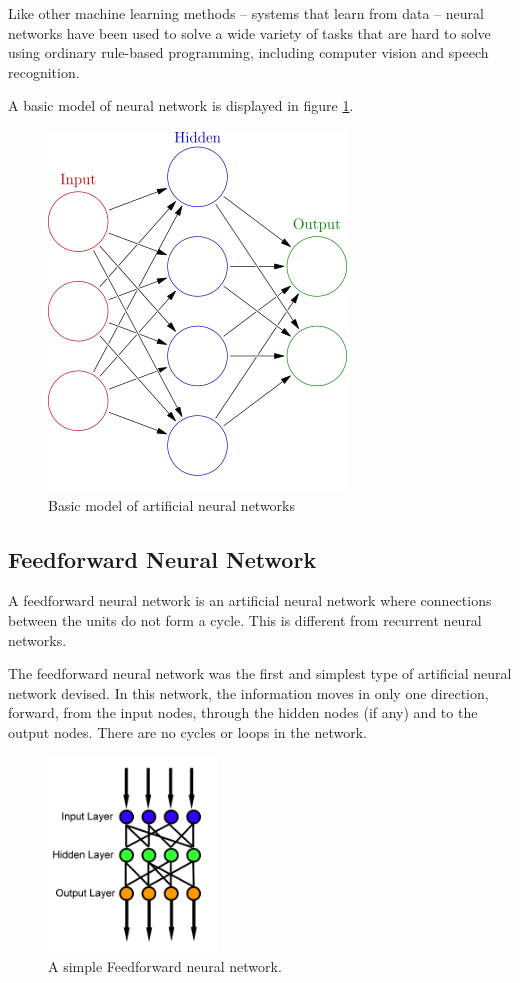 \documentclass[14pt,a4paper]{extarticle}
\begin{document}
Like other machine learning methods – systems that learn from data – neural networks have been used to solve a wide variety of tasks that are hard to solve using ordinary rule-based programming, including computer vision and speech recognition.

A basic model of neural network is displayed in figure \ref{fig:neural_net_model}.

		\begin{figure}[H]
			\includegraphics[width=.4\textwidth, center]{neural_net_example.png}
			\caption{Basic model of artificial neural networks}
			\label{fig:neural_net_model}
		\end{figure}
	
	\subsection{Feedforward Neural Network}
	
	A feedforward neural network is an artificial neural network where connections between the units do not form a cycle. This is different from recurrent neural networks.

The feedforward neural network was the first and simplest type of artificial neural network devised. In this network, the information moves in only one direction, forward, from the input nodes, through the hidden nodes (if any) and to the output nodes. There are no cycles or loops in the network.

		\begin{figure}[H]
			\includegraphics[width=0.4\textwidth, center]{Feed_forward_neural_net.png}
			\caption{A simple Feedforward neural network.}
		\end{figure}
		
\end{document}
